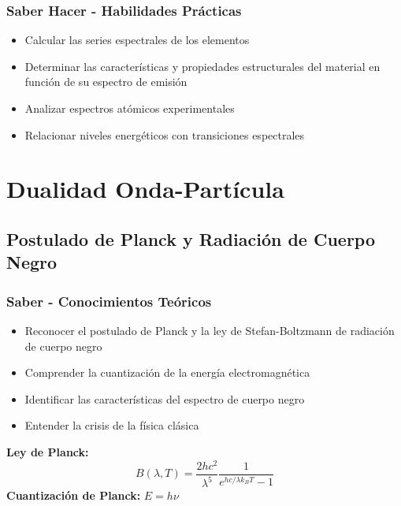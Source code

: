 \documentclass[12pt,a4paper,twoside]{book}
\begin{document}
	\subsection{Saber Hacer - Habilidades Prácticas}
	\begin{hacerbox}
		\begin{itemize}
			\item Calcular las series espectrales de los elementos
			\item Determinar las características y propiedades estructurales del material en función de su espectro de emisión
			\item Analizar espectros atómicos experimentales
			\item Relacionar niveles energéticos con transiciones espectrales
		\end{itemize}
	\end{hacerbox}
	
	\chapter{Dualidad Onda-Partícula}
	\label{chap:dualidad}
	
	\section{Postulado de Planck y Radiación de Cuerpo Negro}
	\label{sec:planck_cuerpo_negro}
	
	\subsection{Saber - Conocimientos Teóricos}
	\begin{saberbox}
		\begin{itemize}
			\item Reconocer el postulado de Planck y la ley de Stefan-Boltzmann de radiación de cuerpo negro
			\item Comprender la cuantización de la energía electromagnética
			\item Identificar las características del espectro de cuerpo negro
			\item Entender la crisis de la física clásica
		\end{itemize}
	\end{saberbox}
	
	\begin{ecuacionbox}
		\textbf{Ley de Planck:}
		$$B(\lambda, T) = \frac{2hc^2}{\lambda^5} \frac{1}{e^{hc/\lambda k_B T} - 1}$$
		\textbf{Cuantización de Planck:} $E = h\nu$
	\end{ecuacionbox}
	
\end{document}
